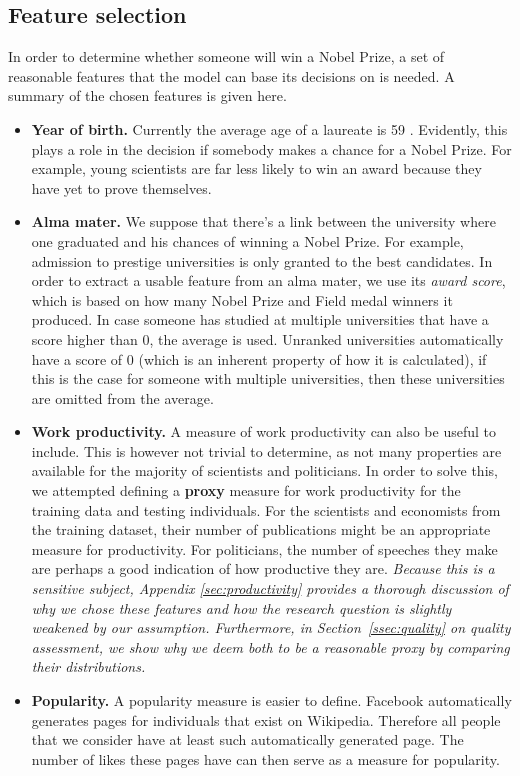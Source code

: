 \subsection{Feature selection}
\label{ssec:features}
In order to determine whether someone will win a Nobel Prize, a set of reasonable features that the model can base its decisions on is needed. A summary of the chosen features is given here. 
\begin{itemize}
\item \textbf{Year of birth.}
Currently the average age of a laureate is 59 \cite{age}. Evidently, this plays a role in the decision if somebody makes a chance for a Nobel Prize. For example, young scientists are far less likely to win an award because they have yet to prove themselves.
\item \textbf{Alma mater.} We suppose that there's a link between the university where one graduated and his chances of winning a Nobel Prize. For example, admission to prestige universities is only granted to the best candidates. In order to extract a usable feature from an alma mater, we use its \emph{award score}, which is based on how many Nobel Prize and Field medal winners it produced. In case someone has studied at multiple universities that have a score higher than 0, the average is used. Unranked universities automatically have a score of 0 (which is an inherent property of how it is calculated), if this is the case for someone with multiple universities, then these universities are omitted from the average.
\item \textbf{Work productivity.} A measure of work productivity can also be useful to include. This is however not trivial to determine, as not many properties are available for the majority of scientists and politicians. In order to solve this, we attempted defining a \textbf{proxy} measure for work productivity for the training data and testing individuals. For the scientists and economists from the training dataset, their number of publications might be an appropriate measure for productivity. For politicians, the number of speeches they make are perhaps a good indication of how productive they are. \emph{Because this is a sensitive subject, Appendix \ref{sec:productivity} provides a thorough discussion of why we chose these features and how the research question is slightly weakened by our assumption. Furthermore, in Section~\ref{ssec:quality} on quality assessment, we show why we deem both to be a reasonable proxy by comparing their distributions.}
\item \textbf{Popularity.} A popularity measure is easier to define. Facebook automatically generates pages for individuals that exist on Wikipedia. Therefore all people that we consider have at least such automatically generated page. The number of likes these pages have can then serve as a measure for popularity. 
\end{itemize}


